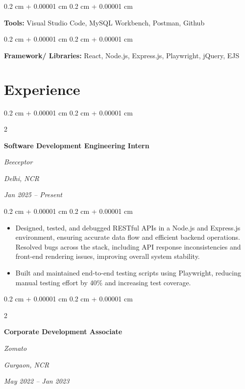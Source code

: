 \documentclass[10pt, letterpaper]{article}
\newenvironment{highlights}{
    \begin{itemize}[
        topsep=0.10 cm,
        parsep=0.10 cm,
        partopsep=0pt,
        itemsep=0pt,
        leftmargin=0.4 cm + 10pt
    ]
}{
    \end{itemize}
} %
\newenvironment{onecolentry}{
    \begin{adjustwidth}{
        0.2 cm + 0.00001 cm
    }{
        0.2 cm + 0.00001 cm
    }
}{
    \end{adjustwidth}
} %
\newenvironment{twocolentry}[2][]{
    \onecolentry
    \def\secondColumn{#2}
    \setcolumnwidth{\fill, 4.5 cm}
    \begin{paracol}{2}
}{
    \switchcolumn \raggedleft \secondColumn
    \end{paracol}
    \endonecolentry
} %
\begin{document}
        \vspace{0.2 cm}

        \begin{onecolentry}
            \textbf{Tools:} Visual Studio Code, MySQL Workbench, Postman, Github
        \end{onecolentry}

        \vspace{0.2 cm}

        \begin{onecolentry}
            \textbf{Framework/ Libraries:} React, Node.js, Express.js, Playwright, jQuery, EJS
        \end{onecolentry}


\section{Experience}


        \begin{twocolentry}{
        \textit{Delhi, NCR}    
            
        \textit{Jan 2025 – Present}}
            \textbf{Software Development Engineering Intern}
            
            \textit{Beeceptor}
        \end{twocolentry}

        \vspace{0.10 cm}
        \begin{onecolentry}
            \begin{highlights}
                
                \item Designed, tested, and debugged RESTful APIs in a Node.js and Express.js environment, ensuring accurate data flow and efficient backend operations. Resolved bugs across the stack, including API response inconsistencies and front-end rendering issues, improving overall system stability.
                \item Built and maintained end-to-end testing scripts using Playwright, reducing manual testing effort by 40\% and increasing test coverage.
            \end{highlights}
        \end{onecolentry}


        \vspace{0.2 cm}


        
        \begin{twocolentry}{
        \textit{Gurgaon, NCR}    
            
        \textit{May 2022 – Jan 2023}}
            \textbf{Corporate Development Associate}
            
            \textit{Zomato}
        \end{twocolentry}
\end{document}
